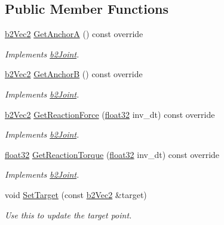 \subsection*{Public Member Functions}
\begin{DoxyCompactItemize}
\item 
\mbox{\hyperlink{structb2_vec2}{b2\+Vec2}} \mbox{\hyperlink{classb2_mouse_joint_a3c42531ac763bca3658a987d0ac7d2c4}{Get\+AnchorA}} () const override
\begin{DoxyCompactList}\small\item\em Implements \mbox{\hyperlink{classb2_joint}{b2\+Joint}}. \end{DoxyCompactList}\item 
\mbox{\hyperlink{structb2_vec2}{b2\+Vec2}} \mbox{\hyperlink{classb2_mouse_joint_adecfaff123ba199f9fc80be7fcb74af2}{Get\+AnchorB}} () const override
\begin{DoxyCompactList}\small\item\em Implements \mbox{\hyperlink{classb2_joint}{b2\+Joint}}. \end{DoxyCompactList}\item 
\mbox{\hyperlink{structb2_vec2}{b2\+Vec2}} \mbox{\hyperlink{classb2_mouse_joint_a1af7bb9f41076b29a1ddefd7b6c2f27b}{Get\+Reaction\+Force}} (\mbox{\hyperlink{b2_settings_8h_aacdc525d6f7bddb3ae95d5c311bd06a1}{float32}} inv\+\_\+dt) const override
\begin{DoxyCompactList}\small\item\em Implements \mbox{\hyperlink{classb2_joint}{b2\+Joint}}. \end{DoxyCompactList}\item 
\mbox{\hyperlink{b2_settings_8h_aacdc525d6f7bddb3ae95d5c311bd06a1}{float32}} \mbox{\hyperlink{classb2_mouse_joint_aa9ea0d1b1aa2db5be3ed63392a7e28a2}{Get\+Reaction\+Torque}} (\mbox{\hyperlink{b2_settings_8h_aacdc525d6f7bddb3ae95d5c311bd06a1}{float32}} inv\+\_\+dt) const override
\begin{DoxyCompactList}\small\item\em Implements \mbox{\hyperlink{classb2_joint}{b2\+Joint}}. \end{DoxyCompactList}\item 
void \mbox{\hyperlink{classb2_mouse_joint_a96f34c1c990407eddbadf07ae359b1f3}{Set\+Target}} (const \mbox{\hyperlink{structb2_vec2}{b2\+Vec2}} \&target)
\begin{DoxyCompactList}\small\item\em Use this to update the target point. \end{DoxyCompactList}\item 

\end{DoxyCompactItemize}
